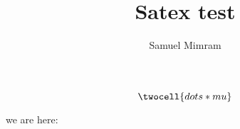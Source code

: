 \documentclass[a4paper]{article}
\title{Satex test}
\author{Samuel Mimram}
\begin{document}
\maketitle

\[
  \twocell{dots * mu}
\]











we are here:













\end{document}
